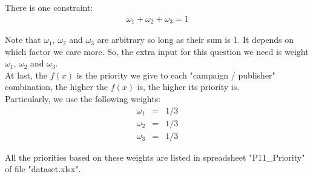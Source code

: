 \documentclass[12pt]{article}
\begin{document}
There is one constraint:
\begin{eqnarray*}
\omega_1 + \omega_2 + \omega_3 = 1
\end{eqnarray*}

Note that $\omega_1$, $\omega_2$ and $\omega_3$ are arbitrary so long as their sum is 1. It depends on which factor we care more. So, the extra input for this question we need is weight $\omega_1$, $\omega_2$ and $\omega_3$. \\

At last, the $f(x)$ is the priority we give to each "campaign / publisher" combination, the higher the $f(x)$ is, the higher its priority is. \\

Particularly, we use the following weights:
\begin{eqnarray*}
\omega_1 &=& 1/3 \\
\omega_2 &=& 1/3 \\
\omega_3 &=& 1/3
\end{eqnarray*}

All the priorities based on these weights are listed in spreadsheet "P11\_Priority" of file "dataset.xlsx". \\
\end{document}
